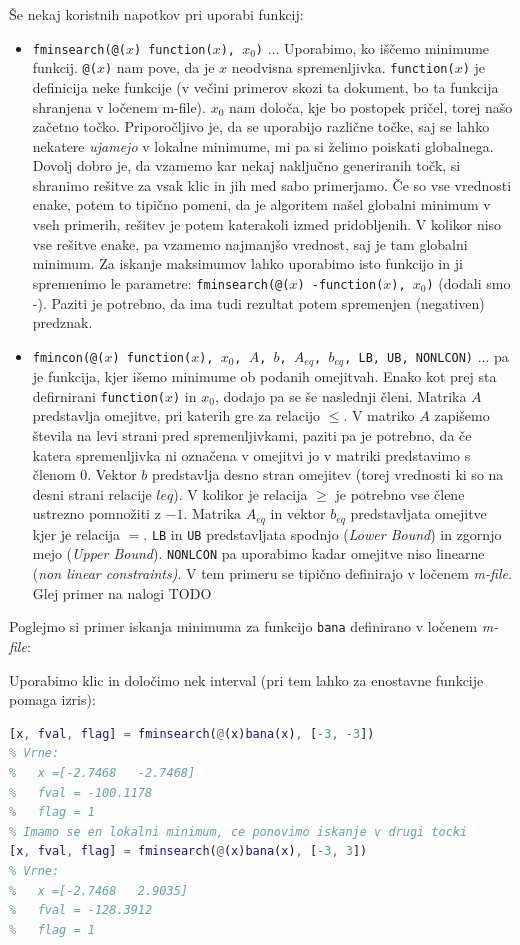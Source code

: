 \documentclass[a4paper,11pt]{article}
\begin{document}
Še nekaj koristnih napotkov pri uporabi funkcij:
\begin{itemize}
	\item \texttt{fminsearch(@($x$) function($x$), $x_0$)} ... Uporabimo, ko iščemo minimume funkcij. \texttt{@($x$)} nam pove, da je $x$ neodvisna spremenljivka. \texttt{function($x$)} je definicija neke funkcije (v večini primerov skozi ta dokument, bo ta funkcija shranjena v ločenem m-file). $x_0$ nam določa, kje bo postopek pričel, torej našo začetno točko. Priporočljivo je, da se uporabijo različne točke, saj se lahko nekatere \textit{ujamejo} v lokalne minimume, mi pa si želimo poiskati globalnega. Dovolj dobro je, da vzamemo kar nekaj naključno generiranih točk, si shranimo rešitve za vsak klic in jih med sabo primerjamo. Če so vse vrednosti enake, potem to tipično pomeni, da je algoritem našel globalni minimum v vseh primerih, rešitev je potem katerakoli izmed pridobljenih. V kolikor niso vse rešitve enake, pa vzamemo najmanjšo vrednost, saj je tam globalni minimum. Za iskanje maksimumov lahko uporabimo isto funkcijo in ji spremenimo le parametre: \texttt{fminsearch(@($x$) -function($x$), $x_0$)} (dodali smo -). Paziti je potrebno, da ima tudi rezultat potem spremenjen (negativen) predznak.
	
	\item \texttt{fmincon(@($x$) function($x$), $x_0$, $A$, $b$, $A_{eq}$, $b_{eq}$, LB, UB, NONLCON)} ... pa je funkcija, kjer išemo minimume ob podanih omejitvah. Enako kot prej sta defirnirani \texttt{function($x$)} in $x_0$, dodajo pa se še naslednji členi. Matrika $A$ predstavlja omejitve, pri katerih gre za relacijo $\leq$. V matriko $A$ zapišemo števila na levi strani pred spremenljivkami, paziti pa je potrebno, da če katera spremenljivka ni označena v omejitvi jo v matriki predstavimo s členom 0. Vektor $b$ predstavlja desno stran omejitev (torej vrednosti ki so na desni strani relacije $leq$). V kolikor je relacija $\geq$ je potrebno vse člene ustrezno pomnožiti z $-1$. Matrika $A_{eq}$ in vektor $b_{eq}$ predstavljata omejitve kjer je relacija $=$. \texttt{LB} in \texttt{UB} predstavljata spodnjo (\textit{Lower Bound}) in zgornjo mejo (\textit{Upper Bound}). \texttt{NONLCON} pa uporabimo kadar omejitve niso linearne (\textit{non linear constraints)}. V tem primeru se tipično definirajo v ločenem \textit{m-file}. Glej primer na nalogi TODO
\end{itemize}

Poglejmo si primer iskanja minimuma za funkcijo \texttt{bana} definirano v ločenem \textit{m-file}:

Uporabimo klic in določimo nek interval (pri tem lahko za enostavne funkcije pomaga izris):
\begin{lstlisting}[label=minsearch_sample_call,language=Matlab]
% Funkcija vraca tocko x, vrednost minimuma fval, in zastavico flag (katero opazujemo da je 1 - pomeni da je najdena ustrezna resitev)
[x, fval, flag] = fminsearch(@(x)bana(x), [-3, -3])
% Vrne:
%	x =[-2.7468   -2.7468]
%	fval = -100.1178
%	flag = 1
% Imamo se en lokalni minimum, ce ponovimo iskanje v drugi tocki
[x, fval, flag] = fminsearch(@(x)bana(x), [-3, 3])
% Vrne:
%	x =[-2.7468   2.9035]
%	fval = -128.3912
%	flag = 1
\end{lstlisting}
\end{document}
